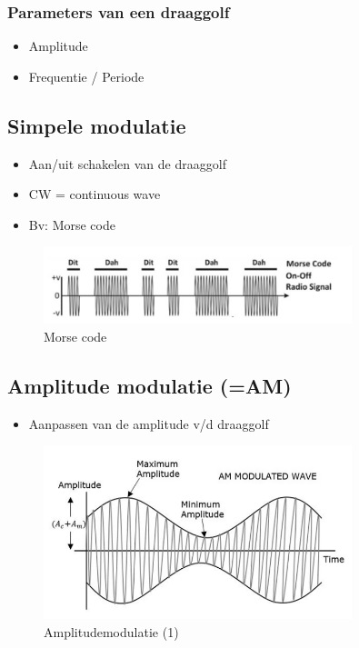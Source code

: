 \documentclass{article}
\begin{document}
\subsubsection{Parameters van een draaggolf}

\begin{itemize}
    \item Amplitude
    \item Frequentie / Periode
\end{itemize}

\subsection{Simpele modulatie}
\begin{itemize}
    \item Aan/uit schakelen van de draaggolf
    \item CW = continuous wave
    \item Bv: Morse code
\end{itemize}

\begin{figure}[H]
    \centering
    \includegraphics[width=0.8\textwidth]{Screenshot_20200302_120000.png}
    \caption{Morse code}
\end{figure}

\subsection{Amplitude modulatie (=AM)}
\begin{itemize}
    \item Aanpassen van de amplitude v/d draaggolf
\end{itemize}

\begin{figure}[H]
    \centering
    \includegraphics[width=0.8\textwidth]{Screenshot_20200302_120121.png}
    \caption{Amplitudemodulatie (1)}
\end{figure}
\end{document}
